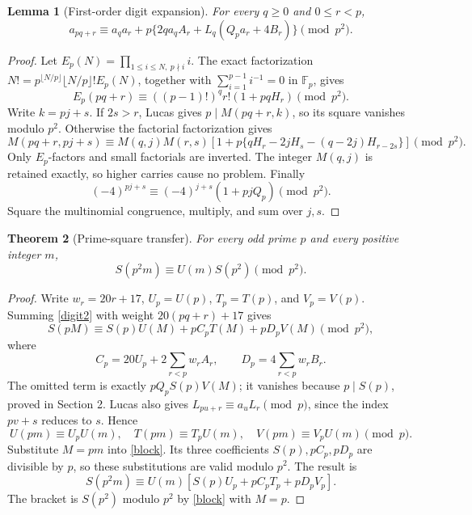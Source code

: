 \documentclass[11pt,a4paper]{article}
\newtheorem{theorem}{Theorem}[section]
\newtheorem{lemma}[theorem]{Lemma}
\theoremstyle{remark}\newtheorem{remark}[theorem]{Remark}
\newcommand{\F}{\mathbb F}
\begin{document}
\begin{lemma}[First-order digit expansion]\label{firstorder}
For every \(q\ge0\) and \(0\le r<p\),
\begin{equation}\label{digit2}
 a_{pq+r}\equiv a_q a_r+
 p\{2q a_q A_r+L_q(Q_p a_r+4B_r)\}\pmod {p^2}.
\end{equation}
\end{lemma}
\begin{proof}
Let \(E_p(N)=\prod_{1\le i\le N,\ p\nmid i}i\).
The exact factorization
\(N!=p^{\lfloor N/p\rfloor}\lfloor N/p\rfloor!E_p(N)\), together with
\(\sum_{i=1}^{p-1}i^{-1}=0\) in \(\F_p\), gives
\[
 E_p(pq+r)\equiv((p-1)!)^q r!(1+pqH_r)\pmod {p^2}.
\]
Write \(k=pj+s\). If \(2s>r\), Lucas gives \(p\mid M(pq+r,k)\),
so its square vanishes modulo \(p^2\).
Otherwise the factorial factorization gives
\[
 M(pq+r,pj+s)\equiv M(q,j)M(r,s)
 [1+p\{qH_r-2jH_s-(q-2j)H_{r-2s}\}]\pmod {p^2}.
\]
Only \(E_p\)-factors and small factorials are inverted.
The integer \(M(q,j)\) is retained exactly, so higher carries cause
no problem. Finally
\[
 (-4)^{pj+s}\equiv(-4)^{j+s}(1+pjQ_p)\pmod {p^2}.
\]
Square the multinomial congruence, multiply, and sum over \(j,s\).
\end{proof}

\begin{theorem}[Prime-square transfer]\label{transfer}
For every odd prime \(p\) and every positive integer \(m\),
\begin{equation}\label{transferformula}
                    S(p^2m)\equiv U(m)S(p^2)\pmod {p^2}.
\end{equation}
\end{theorem}
\begin{proof}
Write \(w_r=20r+17\), \(U_p=U(p)\), \(T_p=T(p)\), and \(V_p=V(p)\).
Summing \eqref{digit2} with weight \(20(pq+r)+17\) gives
\begin{equation}\label{block}
 S(pM)\equiv S(p)U(M)+pC_pT(M)+pD_pV(M)\pmod {p^2},
\end{equation}
where
\[
 C_p=20U_p+2\sum_{r<p}w_rA_r,\qquad
 D_p=4\sum_{r<p}w_rB_r .
\]
The omitted term is exactly \(pQ_p S(p)V(M)\); it vanishes because
\(p\mid S(p)\), proved in Section 2.
Lucas also gives \(L_{pu+r}\equiv a_uL_r\pmod p\), since the index
\(pv+s\) reduces to \(s\). Hence
\[
 U(pm)\equiv U_pU(m),\quad T(pm)\equiv T_pU(m),\quad
 V(pm)\equiv V_pU(m)\pmod p.
\]
Substitute \(M=pm\) into \eqref{block}. Its three coefficients
\(S(p),pC_p,pD_p\) are divisible by \(p\), so these substitutions
are valid modulo \(p^2\). The result is
\[
 S(p^2m)\equiv U(m)[S(p)U_p+pC_pT_p+pD_pV_p].
\]
The bracket is \(S(p^2)\) modulo \(p^2\) by \eqref{block} with \(M=p\).
\end{proof}
\end{document}
